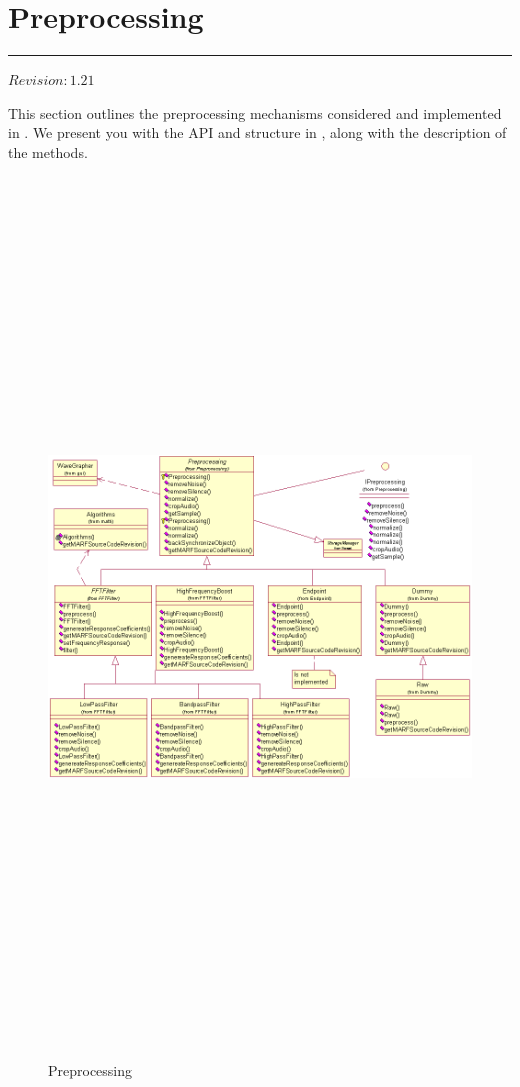 \section{Preprocessing}
\label{sect:preprocessing}

\noindent
\rule{7.0in}{.013in}

$Revision: 1.21 $

This section outlines the preprocessing mechanisms considered
and implemented in {\marf}. We present you with the API and structure in , along with
the description of the methods.

\begin{figure}
	\centering
	\includegraphics[angle=90,height=660pt]{../graphics/arch/preprocessing.png}
	\caption{Preprocessing}
	\label{fig:preprocessing}
\end{figure}

